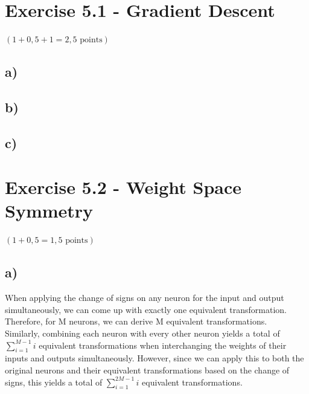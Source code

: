 \documentclass[a4paper]{article}
\begin{document}





\section*{Exercise 5.1 - Gradient Descent}
$(1+0,5+1 = 2,5 \text{ points})$
    \subsection*{a)}
        
        
        
    \subsection*{b)}
        
        
        
    \subsection*{c)}
        
    
    
        


\newpage
\section*{Exercise 5.2 - Weight Space Symmetry}
$(1+0,5 = 1,5 \text{ points})$
    \subsection*{a)}
    When applying the change of signs on any neuron for the input and output simultaneously, we can come up with exactly one equivalent transformation. Therefore, for M neurons, we can derive M equivalent transformations.\\
    Similarly, combining each neuron with every other neuron yields a total of $\sum_{i=1}^{M-1} i$ equivalent transformations when interchanging the weights of their inputs and outputs simultaneously. However, since we can apply this to both the original neurons and their equivalent transformations based on the change of signs, this yields a total of $\sum_{i=1}^{2M-1} i$ equivalent transformations.
    
\end{document}
